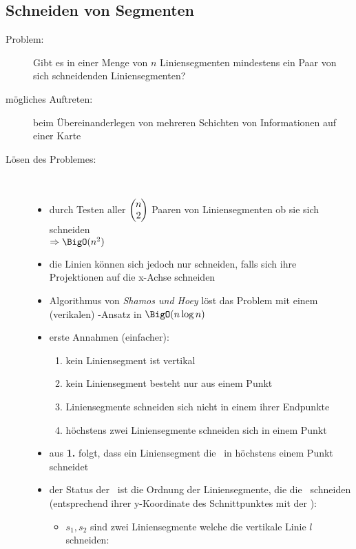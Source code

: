 \subsection{Schneiden von Segmenten}
\begin{description}
	\item[Problem:] Gibt es in einer Menge von $n$ Liniensegmenten mindestens ein Paar von sich schneidenden Liniensegmenten?
	\item[mögliches Auftreten:] beim Übereinanderlegen von mehreren Schichten von Informationen auf einer Karte
	\item[Lösen des Problemes:] \ \\\up
		\begin{itemize}
			\item durch Testen aller $\left(\hspace*{-0.2cm}\begin{array}{c} n\\2\end{array}\hspace*{-0.2cm}\right)$ Paaren von Liniensegmenten ob sie sich schneiden\\
			$\Rightarrow \BigO(n^2)$
			\item die Linien können sich jedoch nur schneiden, falls sich ihre Projektionen auf die x-Achse schneiden
			\item Algorithmus von \textit{Shamos und Hoey} löst das Problem mit einem (verikalen) \sweep-Ansatz in $\BigO(n\log n)$
			\item erste Annahmen (einfacher):
				\begin{enumerate}
					\item kein Liniensegment ist vertikal
					\item kein Liniensegment besteht nur aus einem Punkt
					\item Liniensegmente schneiden sich nicht in einem ihrer Endpunkte
					\item höchstens zwei Liniensegmente schneiden sich in einem Punkt
				\end{enumerate}
			\item aus \textbf{1.} folgt, dass ein Liniensegment die \sweep~in höchstens einem Punkt schneidet
			\item der Status der \sweep~ist die Ordnung der Liniensegmente, die die \sweep~schneiden (entsprechend ihrer y-Koordinate des Schnittpunktes mit der \sweep):
				\begin{itemize}
					\item $s_1,s_2$ sind zwei Liniensegmente welche die vertikale Linie $l$ schneiden:\\

\end{itemize}
\end{itemize}
\end{description}
